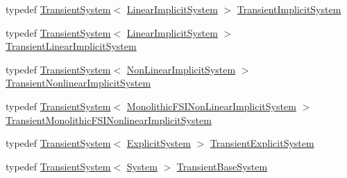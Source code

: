 \begin{DoxyCompactItemize}
\item 
typedef \mbox{\hyperlink{classfemus_1_1_transient_system}{Transient\+System}}$<$ \mbox{\hyperlink{classfemus_1_1_linear_implicit_system}{Linear\+Implicit\+System}} $>$ \mbox{\hyperlink{namespacefemus_af881f9d0784fc3645b2eaeb0da265bed}{Transient\+Implicit\+System}}
\item 
typedef \mbox{\hyperlink{classfemus_1_1_transient_system}{Transient\+System}}$<$ \mbox{\hyperlink{classfemus_1_1_linear_implicit_system}{Linear\+Implicit\+System}} $>$ \mbox{\hyperlink{namespacefemus_a54c4ce2e1808fb027338a05a48a2cbbc}{Transient\+Linear\+Implicit\+System}}
\item 
typedef \mbox{\hyperlink{classfemus_1_1_transient_system}{Transient\+System}}$<$ \mbox{\hyperlink{classfemus_1_1_non_linear_implicit_system}{Non\+Linear\+Implicit\+System}} $>$ \mbox{\hyperlink{namespacefemus_ac21c0878b82b324aff0b6fe910674efa}{Transient\+Nonlinear\+Implicit\+System}}
\item 
typedef \mbox{\hyperlink{classfemus_1_1_transient_system}{Transient\+System}}$<$ \mbox{\hyperlink{classfemus_1_1_monolithic_f_s_i_non_linear_implicit_system}{Monolithic\+F\+S\+I\+Non\+Linear\+Implicit\+System}} $>$ \mbox{\hyperlink{namespacefemus_a2c5863a5e6c0f302d1d26a65da72437d}{Transient\+Monolithic\+F\+S\+I\+Nonlinear\+Implicit\+System}}
\item 
typedef \mbox{\hyperlink{classfemus_1_1_transient_system}{Transient\+System}}$<$ \mbox{\hyperlink{classfemus_1_1_explicit_system}{Explicit\+System}} $>$ \mbox{\hyperlink{namespacefemus_acaff987f3f3f11fb7d5961f1256f339c}{Transient\+Explicit\+System}}
\item 
typedef \mbox{\hyperlink{classfemus_1_1_transient_system}{Transient\+System}}$<$ \mbox{\hyperlink{classfemus_1_1_system}{System}} $>$ \mbox{\hyperlink{namespacefemus_abe2c25355d84d2a659e9f8e952a58062}{Transient\+Base\+System}}
\end{DoxyCompactItemize}
